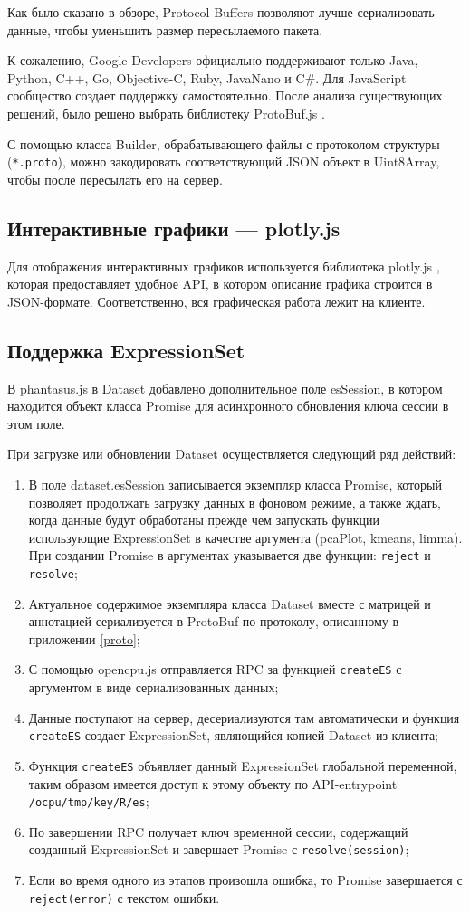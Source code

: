 \documentclass[annotation,specification]{itmo-student-thesis}
\begin{document}
Как было сказано в обзоре, Protocol Buffers позволяют лучше сериализовать данные, чтобы уменьшить размер пересылаемого пакета.

К сожалению, Google Developers официально поддерживают только Java, Python, C++, Go, Objective-C, Ruby, JavaNano и C\#. Для JavaScript сообщество создает поддержку самостоятельно. После анализа существующих решений, было решено выбрать библиотеку ProtoBuf.js \cite{protobufjs}.

С помощью класса Builder, обрабатывающего файлы с протоколом структуры (\texttt{*.proto}), можно закодировать соответствующий JSON объект в Uint8Array, чтобы после пересылать его на сервер.

\subsection{Интерактивные графики --- plotly.js}
Для отображения интерактивных графиков используется библиотека plotly.js \cite{plotly}, которая предоставляет удобное API, в котором описание графика строится в JSON-формате. Соответственно, вся графическая работа лежит на клиенте.

\subsection{Поддержка ExpressionSet}
В phantasus.js в Dataset добавлено дополнительное поле esSession, в котором находится объект класса Promise для асинхронного обновления ключа сессии в этом поле.

При загрузке или обновлении Dataset осуществляется следующий ряд действий:
\begin{enumerate}
\item В поле dataset.esSession записывается экземпляр класса Promise, который позволяет продолжать загрузку данных в фоновом режиме, а также ждать, когда данные будут обработаны прежде чем запускать функции использующие ExpressionSet в качестве аргумента (pcaPlot, kmeans, limma). При создании Promise в аргументах указывается две функции: \texttt{reject} и \texttt{resolve};
\item Актуальное содержимое экземпляра класса Dataset вместе с матрицей и аннотацией сериализуется в ProtoBuf по протоколу, описанному в приложении \ref{proto};
\item С помощью opencpu.js отправляется RPC за функцией \texttt{createES} с аргументом в виде сериализованных данных;
\item Данные поступают на сервер, десериализуются там автоматически и функция \texttt{createES} создает ExpressionSet, являющийся копией Dataset из клиента;
\item Функция \texttt{createES} объявляет данный ExpressionSet глобальной переменной, таким образом имеется доступ к этому объекту по API-entrypoint \texttt{/ocpu/tmp/{key}/R/es};
\item По завершении RPC получает ключ временной сессии, содержащий созданный ExpressionSet и завершает Promise с \texttt{resolve(session)};
\item Если во время одного из этапов произошла ошибка, то Promise завершается с \texttt{reject(error)} с текстом ошибки.
\end{enumerate}
\end{document}
